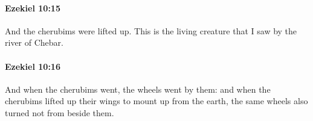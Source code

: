 		\paragraph{Ezekiel 10:15} %
			\label{EZEKIEL-10-15}

			And the cherubims were lifted up. This is the living creature that I saw by the river of Chebar.


		\paragraph{Ezekiel 10:16} %
			\label{EZEKIEL-10-16}

			And when the cherubims went, the wheels went by them: and when the cherubims lifted up their wings to mount up from the earth, the same wheels also turned not from beside them.


